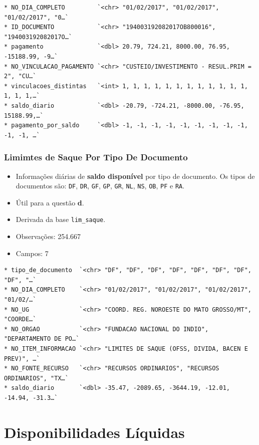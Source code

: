 \documentclass[
]{book}
\begin{document}
\begin{verbatim}
* NO_DIA_COMPLETO         `<chr> "01/02/2017", "01/02/2017", "01/02/2017", "0…`
* ID_DOCUMENTO            `<chr> "194003192082017OB800016", "194003192082017O…`
* pagamento               `<dbl> 20.79, 724.21, 8000.00, 76.95, -15188.99, -9…`
* NO_VINCULACAO_PAGAMENTO `<chr> "CUSTEIO/INVESTIMENTO - RESUL.PRIM = 2", "CU…`
* vinculacoes_distintas   `<int> 1, 1, 1, 1, 1, 1, 1, 1, 1, 1, 1, 1, 1, 1, 1,…`
* saldo_diario            `<dbl> -20.79, -724.21, -8000.00, -76.95, 15188.99,…`
* pagamento_por_saldo     `<dbl> -1, -1, -1, -1, -1, -1, -1, -1, -1, -1, -1, …`
\end{verbatim}

\hypertarget{limimtes-de-saque-por-tipo-de-documento}{%
\subsection{Limimtes de Saque Por Tipo De Documento}\label{limimtes-de-saque-por-tipo-de-documento}}

\begin{itemize}
\item
  Informações diárias de \textbf{saldo disponível} por tipo de documento. Os tipos de documentos são: \texttt{DF}, \texttt{DR}, \texttt{GF}, \texttt{GP}, \texttt{GR}, \texttt{NL}, \texttt{NS}, \texttt{OB}, \texttt{PF} e \texttt{RA}.
\item
  Útil para a questão \textbf{d}.
\item
  Derivada da base \texttt{lim\_saque}.
\item
  Observações: 254.667
\item
  Campos: 7
\end{itemize}

\begin{verbatim}
* tipo_de_documento  `<chr> "DF", "DF", "DF", "DF", "DF", "DF", "DF", "DF", "…`
* NO_DIA_COMPLETO    `<chr> "01/02/2017", "01/02/2017", "01/02/2017", "01/02/…`
* NO_UG              `<chr> "COORD. REG. NOROESTE DO MATO GROSSO/MT", "COORDE…`
* NO_ORGAO           `<chr> "FUNDACAO NACIONAL DO INDIO", "DEPARTAMENTO DE PO…`
* NO_ITEM_INFORMACAO `<chr> "LIMITES DE SAQUE (OFSS, DIVIDA, BACEN E PREV)", …`
* NO_FONTE_RECURSO   `<chr> "RECURSOS ORDINARIOS", "RECURSOS ORDINARIOS", "TX…`
* saldo_diario       `<dbl> -35.47, -2089.65, -3644.19, -12.01, -14.94, -31.3…`
\end{verbatim}

\hypertarget{disponibilidades-luxedquidas}{%
\chapter{Disponibilidades Líquidas}\label{disponibilidades-luxedquidas}}
\end{document}
